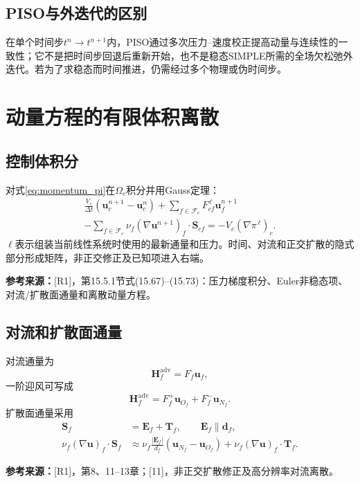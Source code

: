 \documentclass[UTF8,12pt,a4paper]{ctexart}
\numberwithin{equation}{section}
\newcommand{\dt}{\Delta t}
\newcommand{\Jasak}{\textnormal{[11]}}
\newcommand{\Rone}{\textnormal{[R1]}}
\newcommand{\source}[1]{\par\smallskip\noindent\colorbox{sourcebg}{%
  \parbox{0.955\linewidth}{\footnotesize\color{sourcegray}\textbf{参考来源：}#1}}\par\smallskip}
\begin{document}
\subsection{PISO与外迭代的区别}
在单个时间步$t^n\to t^{n+1}$内，PISO通过多次压力--速度校正提高动量与连续性的一致性；它不是把时间步回退后重新开始，也不是稳态SIMPLE所需的全场欠松弛外迭代。若为了求稳态而时间推进，仍需经过多个物理或伪时间步。

\section{动量方程的有限体积离散}
\subsection{控制体积分}
对式\eqref{eq:momentum_pi}在$\Omega_c$积分并用Gauss定理：
\begin{multline}
  \frac{V_c}{\dt}(\bm u_c^{n+1}-\bm u_c^n)
  +\sum_{f\in\mathcal F_c}F_{cf}^{\,\ell}\bm u_f^{n+1}\\
  -\sum_{f\in\mathcal F_c}\nu_f(\nabla\bm u^{n+1})_f\cdot\bm S_{cf}
  =-V_c(\nabla\pi^{\,\ell})_c.
  \label{eq:momentum_fvm}
\end{multline}
$\ell$表示组装当前线性系统时使用的最新通量和压力。时间、对流和正交扩散的隐式部分形成矩阵，非正交修正及已知项进入右端。
\source{\Rone，第15.5.1节式(15.67)--(15.73)：压力梯度积分、Euler非稳态项、对流/扩散面通量和离散动量方程。}

\subsection{对流和扩散面通量}
对流通量为
\begin{equation}
  \bm H_f^{\mathrm{adv}}=F_f\bm u_f,
\end{equation}
一阶迎风可写成
\begin{equation}
  \bm H_f^{\mathrm{adv}}
  =F_f^+\bm u_{O_f}+F_f^-\bm u_{N_f}.
\end{equation}
扩散面通量采用
\begin{align}
  \bm S_f&=\bm E_f+\bm T_f,\qquad \bm E_f\parallel\bm d_f,\\
  \nu_f(\nabla\bm u)_f\cdot\bm S_f
  &\approx \nu_f\frac{|\bm E_f|}{d_f}(\bm u_{N_f}-\bm u_{O_f})
  +\nu_f(\nabla\bm u)_f\cdot\bm T_f.
\end{align}
\source{\Rone，第8、11--13章；\Jasak，非正交扩散修正及高分辨率对流离散。}
\end{document}

